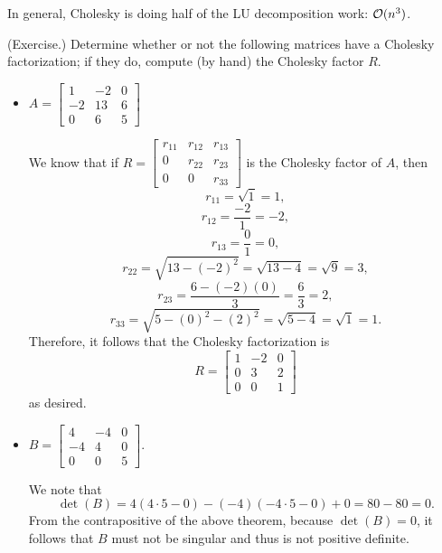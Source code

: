 \documentclass[letterpaper]{article}
\newcommand{\0}{\mathbf{0}}
\begin{document}
\bigskip 

In general, Cholesky is doing half of the LU decomposition work: $\mathcal{O}(n^3)$. 


\begin{mdframed}
    (Exercise.) Determine whether or not the following matrices have a Cholesky factorization; if they do, compute (by hand) the Cholesky factor $R$.

    \begin{itemize}
        \item $A = \begin{bmatrix}
            1 & -2 & 0 \\ 
            -2 & 13 & 6 \\ 
            0 & 6 & 5
        \end{bmatrix}$

        \begin{mdframed}
            We know that if $R = \begin{bmatrix}
                r_{11} & r_{12} & r_{13} \\ 
                0 & r_{22} & r_{23} \\ 
                0 & 0 & r_{33}
            \end{bmatrix}$ is the Cholesky factor of $A$, then 
            \[r_{11} = \sqrt{1} = 1,\]
            \[r_{12} = \frac{-2}{1} = -2,\]
            \[r_{13} = \frac{0}{1} = 0,\]
            \[r_{22} = \sqrt{13 - (-2)^2} = \sqrt{13 - 4} = \sqrt{9} = 3,\]
            \[r_{23} = \frac{6 - (-2)(0)}{3} = \frac{6}{3} = 2,\]
            \[r_{33} = \sqrt{5 - (0)^2 - (2)^2} = \sqrt{5 - 4} = \sqrt{1} = 1.\]
            Therefore, it follows that the Cholesky factorization is 
            \[R = \begin{bmatrix}
                1 & -2 & 0 \\ 
                0 & 3 & 2 \\ 
                0 & 0 & 1
            \end{bmatrix}\]
            as desired.
        \end{mdframed}

        \item $B = \begin{bmatrix}
            4 & -4 & 0 \\ 
            -4 & 4 & 0 \\ 
            0 & 0 & 5
        \end{bmatrix}.$

        \begin{mdframed}
            We note that 
            \[\det(B) = 4(4 \cdot 5 - 0) - (-4)(-4 \cdot 5 - 0) + 0 = 80 - 80 = 0.\]
            From the contrapositive of the above theorem, because $\det(B) = 0$, it follows that $B$ must not be singular and thus is not positive definite. 
        \end{mdframed}
    \end{itemize}
\end{mdframed}
\end{document}
